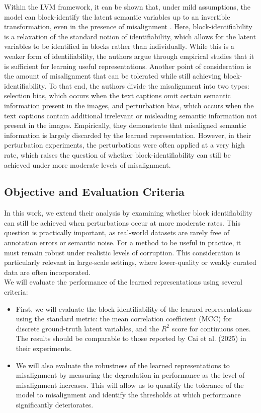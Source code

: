\documentclass[a4paper,12pt]{article}
\begin{document}
Within the LVM framework, it can be shown that, under mild assumptions, the model can block-identify the latent semantic variables up to an invertible transformation, even in the presence of misalignment \cite{NEURIPS2021_8929c70f}. Here, block-identifiability is a relaxation of the standard notion of identifiability, which allows for the latent variables to be identified in blocks rather than individually. While this is a weaker form of identifiability, the authors argue through empirical studies that it is sufficient for learning useful representations. Another point of consideration is the amount of misalignment that can be tolerated while still achieving block-identifiability. To that end, the authors divide the misalignment into two types: selection bias, which occurs when the text captions omit certain semantic information present in the images, and perturbation bias, which occurs when the text captions contain additional irrelevant or misleading semantic information not present in the images. Empirically, they demonstrate that misaligned semantic information is largely discarded by the learned representation. However, in their perturbation experiments, the perturbations were often applied at a very high rate, which raises the question of whether block-identifiability can still be achieved under more moderate levels of misalignment.

\subsection*{Objective and Evaluation Criteria}

In this work, we extend their analysis by examining whether block identifiability can still be achieved when perturbations occur at more moderate rates. This question is practically important, as real-world datasets are rarely free of annotation errors or semantic noise. For a method to be useful in practice, it must remain robust under realistic levels of corruption. This consideration is particularly relevant in large-scale settings, where lower-quality or weakly curated data are often incorporated. \\

We will evaluate the performance of the learned representations using several criteria:
\begin{itemize}
  \item First, we will evaluate the block-identifiability of the learned representations using the standard metric: the mean correlation coefficient (MCC) for discrete ground-truth latent variables, and the $R^2$ score for continuous ones. The results should be comparable to those reported by Cai et al. (2025) in their experiments.
  \item We will also evaluate the robustness of the learned representations to misalignment by measuring the degradation in performance as the level of misalignment increases. This will allow us to quantify the tolerance of the model to misalignment and identify the thresholds at which performance significantly deteriorates.
\end{itemize}
\end{document}
